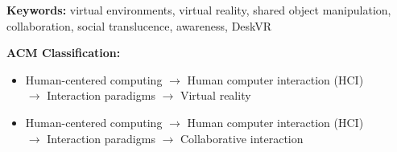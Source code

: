 \noindent\textbf{Keywords:} virtual environments, virtual reality, shared object manipulation, collaboration, social translucence, awareness, DeskVR

\vspace{1em}

\noindent\textbf{ACM Classification:}

\begin{itemize}
    \item Human-centered computing $\rightarrow$ Human computer interaction (HCI) \\ $\rightarrow$ Interaction paradigms $\rightarrow$ Virtual reality 
    \item Human-centered computing $\rightarrow$ Human computer interaction (HCI) \\ $\rightarrow$ Interaction paradigms $\rightarrow$ Collaborative interaction
\end{itemize}
